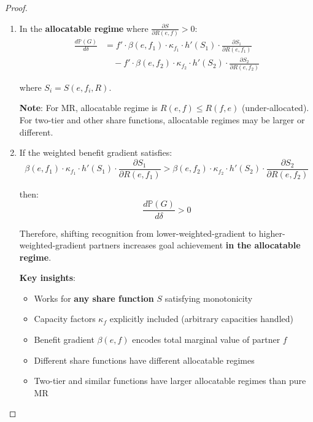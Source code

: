 \documentclass[11pt,a4paper]{article}
\theoremstyle{definition}
\theoremstyle{remark}
\begin{document}
\begin{proof}
\begin{enumerate}
\textbf{For two-tier and other share functions}: $\frac{\partial S}{\partial R(e,f)} > 0$ in larger or different regimes.

\item In the \textbf{allocatable regime} where $\frac{\partial S}{\partial R(e,f)} > 0$:
\begin{align*}
\frac{d\mathbb{P}(G)}{d\delta} &= f' \cdot \beta(e,f_1) \cdot \kappa_{f_1} \cdot h'(S_1) \cdot \frac{\partial S_1}{\partial R(e,f_1)} \\
&\quad - f' \cdot \beta(e,f_2) \cdot \kappa_{f_2} \cdot h'(S_2) \cdot \frac{\partial S_2}{\partial R(e,f_2)}
\end{align*}

where $S_i = S(e,f_i,R)$.

\textbf{Note}: For MR, allocatable regime is $R(e,f) \le R(f,e)$ (under-allocated). For two-tier and other share functions, allocatable regimes may be larger or different.

\item If the weighted benefit gradient satisfies:
\[ \beta(e,f_1) \cdot \kappa_{f_1} \cdot h'(S_1) \cdot \frac{\partial S_1}{\partial R(e,f_1)} > \beta(e,f_2) \cdot \kappa_{f_2} \cdot h'(S_2) \cdot \frac{\partial S_2}{\partial R(e,f_2)} \]

then:
\[ \frac{d\mathbb{P}(G)}{d\delta} > 0 \]

Therefore, shifting recognition from lower-weighted-gradient to higher-weighted-gradient partners increases goal achievement \textbf{in the allocatable regime}.

\textbf{Key insights}:
\begin{itemize}
\item Works for \textbf{any share function} $S$ satisfying monotonicity
\item Capacity factors $\kappa_f$ explicitly included (arbitrary capacities handled)
\item Benefit gradient $\beta(e,f)$ encodes total marginal value of partner $f$
\item Different share functions have different allocatable regimes
\item Two-tier and similar functions have larger allocatable regimes than pure MR
\end{itemize}
\end{enumerate}
\end{proof}
\end{document}
